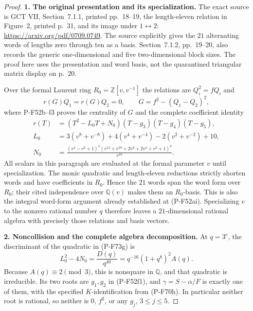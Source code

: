 \begin{proof}
\par\medskip\noindent\textbf{1. The original presentation and its specialization.}
The exact source is GCT VII, Section~7.1.1, printed
pp.~18--19, the length-eleven relation in Figure~2,
printed p.~31, and its image under $1\leftrightarrow2$:
\url{https://arxiv.org/pdf/0709.0749}.
The source explicitly gives the $21$ alternating words
of lengths zero through ten as a basis.  Section~7.1.2,
pp.~19--20, also records the generic one-dimensional
and five two-dimensional block sizes.  The proof here
uses the presentation and word basis, not the
quarantined triangular matrix display on p.~20.

Over the formal Laurent ring $R_0=\mathbb Z[v,v^{-1}]$
the relations are $Q_i^2=fQ_i$ and
\[
                    r(G)Q_1=r(G)Q_2=0,
 \qquad G=f^2-(Q_1-Q_2)^2,
                                                               \tag{P-F73f}
\]
where P-F52b--f3 proves the centrality of $G$ and the
complete coefficient identity
\[
 \begin{split}
 r(T)&=(T^2-L_0T+N_0)(T-g_3)(T-g_4)(T-g_5),\\
 L_0&=3(v^8+v^{-8})+4(v^4+v^{-4})
                               -2(v^2+v^{-2})+10,\\
 N_0&=\frac{(v^4-v^2+1)^2
          (v^{12}+v^{10}+2v^8+2v^4+v^2+1)^2}{v^{16}}.
 \end{split}                                                   \tag{P-F73g}
\]
All scalars in this paragraph are evaluated at the
formal parameter $v$ until specialization.
The monic quadratic and length-eleven reductions
strictly shorten words and have coefficients in
$R_0$.  Hence the $21$ words span the word form over
$R_0$; their cited independence over $\mathbb Q(v)$
makes them an $R_0$-basis.  This is also the integral
word-form argument already established at (P-F52ai).
Specializing $v$ to the nonzero rational number $q$
therefore leaves a $21$-dimensional rational algebra
with precisely those relations and basis vectors.

\par\medskip\noindent\textbf{2. Noncollision and the complete algebra decomposition.}
At $q=3^e$, the discriminant of the quadratic in
(P-F73g) is
\[
             L_0^2-4N_0=\frac{D(q)}{q^{40}}
                       =q^{-16}(1+q^8)^2A(q).
                                                               \tag{P-F73h}
\]
Because $A(q)\equiv2\pmod3$, this is nonsquare in
$\mathbb Q$, and that quadratic is irreducible.
Its two roots are $g_1,g_2$ in (P-F52f1), and
$\gamma=S-\alpha/F$ is exactly one of them, with the
specified $K$-identification from (P-F70h).
In particular neither root is rational, so neither
is $0$, $f^2$, or any $g_j$, $3\le j\le5$.


\end{proof}
